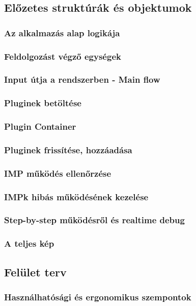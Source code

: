 \documentclass[a4paper,12pt,oneside]{report}
\begin{document}
\subsection{Előzetes struktúrák és objektumok}

\subsubsection{Az alkalmazás alap logikája}
\subsubsection{Feldolgozást végző egységek}
\subsubsection{Input útja a rendszerben - Main flow}
\subsubsection{Pluginek betöltése}
\subsubsection{Plugin Container}
\subsubsection{Pluginek frissítése, hozzáadása}
\subsubsection{IMP működés ellenőrzése}
\subsubsection{IMPk hibás működésének kezelése}
\subsubsection{Step-by-step működésről és realtime debug}
\subsubsection{A teljes kép}

\subsection{Felület terv}
\subsubsection{Használhatósági és ergonomikus szempontok}
\end{document}
